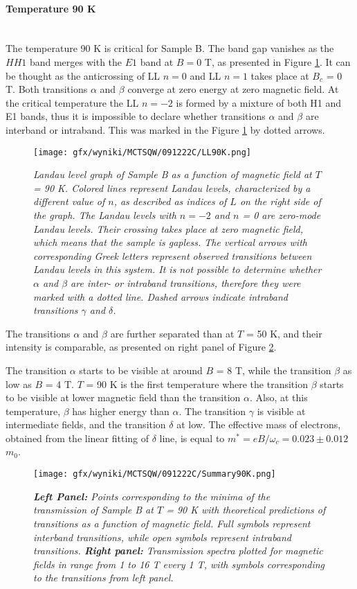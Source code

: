 \documentclass[titlepage,a4paper]{book}
\newcommand{\myparagraph}[1]{\paragraph{#1}\mbox{}\\}
\begin{document}
\clearpage
\myparagraph{Temperature 90 K}
The temperature 90 K is critical for Sample B. The band gap vanishes as the $HH1$ band merges with the $E1$ band at $B = 0$ T, as presented in Figure \ref{fig:LL_SQW_90K}. It can be thought as the anticrossing of LL $n = 0$ and LL $n = 1$ takes place at $B_c$ = 0 T. Both transitions $\alpha$ and $\beta$ converge at zero energy at zero magnetic field. At the critical temperature the LL $n = -2$ is formed by a mixture of both H1 and E1 bands, thus it is impossible to declare whether transitions $\alpha$ and $\beta$ are interband or intraband. This was marked in the Figure \ref{fig:LL_SQW_90K} by dotted arrows.
\begin{figure}[ht]
	\centering
	\texttt{[image: gfx/wyniki/MCTSQW/091222C/LL90K.png]}
	\vspace{-10pt}
	\caption{\textit{Landau level graph of Sample B as a function of magnetic field at $T$ = 90 K. Colored lines represent Landau levels, characterized by a different value of $n$, as described as indices of $L$ on the right side of the graph. The Landau levels with $n = -2$ and $n$ = 0 are zero-mode Landau levels. Their crossing takes place at zero magnetic field, which means that the sample is gapless. The vertical arrows with corresponding Greek letters represent observed transitions between Landau levels in this system. It is not possible to determine whether $\alpha$ and $\beta$ are inter- or intraband transitions, therefore they were marked with a dotted line. Dashed arrows indicate intraband transitions $\gamma$ and $\delta$.}}
	\label{fig:LL_SQW_90K}
\end{figure}

The transitions $\alpha$ and $\beta$ are further separated than at $T$ = 50 K, and their intensity is comparable, as presented on right panel of Figure \ref{fig:Summary_SQW_90K}.

The transition $\alpha$ starts to be visible at around $B$ = 8 T, while the transition $\beta$ as low as $B$ = 4 T. $T$ = 90 K is the first temperature where the transition $\beta$ starts to be visible at lower magnetic field than the transition $\alpha$. Also, at this temperature, $\beta$ has higher energy than $\alpha$. The transition $\gamma$ is visible at intermediate fields, and the transition $\delta$ at low. The effective mass of electrons, obtained from the linear fitting of $\delta$ line, is equal to $m^* = eB/\omega_c = 0.023 \pm 0.012$ $m_0$. 

\begin{figure}[H]
	\centering
	\texttt{[image: gfx/wyniki/MCTSQW/091222C/Summary90K.png]}
	\vspace{-10pt}
	\caption{\textit{\textbf{Left Panel:} Points corresponding to the minima of the transmission of Sample B at $T$ = 90 K with theoretical predictions of transitions as a function of magnetic field. Full symbols represent interband transitions, while open symbols represent intraband transitions. \textbf{Right panel:} Transmission spectra plotted for magnetic fields in range from 1 to 16 T every 1 T, with symbols corresponding to the transitions from left panel.}}
	\label{fig:Summary_SQW_90K}
\end{figure}
\end{document}

